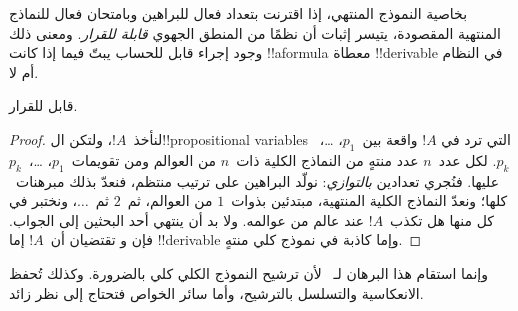 \documentclass[../../../include/open-logic-section]{subfiles}
\begin{document}

بخاصية النموذج المنتهي، إذا اقترنت بتعداد فعال للبراهين وبامتحان فعال
للنماذج المنتهية المقصودة، يتيسر إثبات أن نظمًا من المنطق الجهوي
\emph{قابلة للقرار}. ومعنى ذلك وجود إجراء قابل للحساب يبتّ فيما إذا
كانت !!a{formula} معطاة !!{derivable} في النظام أم لا.

\begin{thm}
   قابل للقرار.
\end{thm}

\begin{proof}
  لنأخذ~$!A$، ولتكن ال!!{propositional variable}s التي ترد في
  $!A$ واقعة بين~$p_1$، \dots،~$p_k$. لكل عدد~$n$ عدد منتهٍ من
  النماذج الكلية ذات~$n$ من العوالم ومن تقويمات~$p_1$،
  \dots،~$p_k$ عليها. فنُجري تعدادين \emph{بالتوازي}: نولّد البراهين
  على ترتيب منتظم، فنعدّ بذلك مبرهنات~ كلها؛ ونعدّ النماذج
  الكلية المنتهية، مبتدئين بذوات~$1$ من العوالم، ثم~$2$ ثم~$\dots$،
  ونختبر في كل منها هل تكذب~$!A$ عند عالم من عوالمه.
  ولا بد أن ينتهي أحد البحثين إلى الجواب. فإن
   و
  تقتضيان أن~$!A$ إما !!{derivable} وإما كاذبة في نموذج كلي منتهٍ.
\end{proof}

وإنما استقام هذا البرهان لـ~ لأن ترشيح النموذج الكلي كلي
بالضرورة. وكذلك تُحفظ الانعكاسية والتسلسل بالترشيح، وأما سائر الخواص
فتحتاج إلى نظر زائد.
\end{document}
